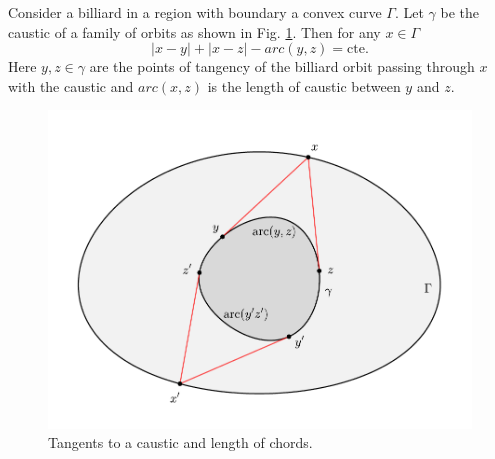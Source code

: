    \begin{proposition} Consider a billiard in a region with boundary a convex curve $\Gamma$. Let $\gamma$ be the caustic of a family of orbits as shown in Fig. \ref{fig:appC-corda2}. Then for any $x\in \Gamma$
   \[ |x-y|+|x-z|-arc(y,z) =\text{cte}.\]
   Here $y,z\in \gamma$ are the points of tangency of the billiard orbit passing through $x$ with the caustic and $arc(x,z)$ is the length of caustic between $y$ and $z$.
    \begin{figure}[H]
	\begin{center}
		 \includegraphics[scale=0.6]{zappC/pics/pics_appC_100_duas_curvas.pdf}
		\caption { Tangents to a caustic and length of chords.\label{fig:appC-corda2}}
	\end{center}
\end{figure}
   \end{proposition}
   
